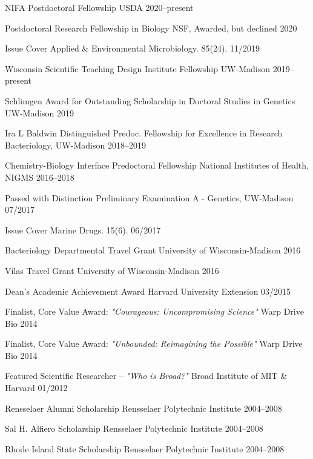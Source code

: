 \begin{cvhonors}

\cvhonor
{NIFA Postdoctoral Fellowship}
{USDA}
{2020--present}

\cvhonor
{Postdoctoral Research Fellowship in Biology}
{NSF, Awarded, but declined}
{2020}

\cvhonor
{Issue Cover}
{Applied \& Environmental Microbiology. 85(24).}
{11/2019}

\cvhonor
{Wisconsin Scientific Teaching Design Institute Fellowship}
{UW-Madison}
{2019--present}

\cvhonor
{Schlimgen Award for Outstanding Scholarship in Doctoral Studies in Genetics}
{UW-Madison}
{2019}

\cvhonor
{Ira L Baldwin Distinguished Predoc. Fellowship for Excellence in Research}
{Bacteriology, UW-Madison}
{2018--2019}

\cvhonor
{Chemistry-Biology Interface Predoctoral Fellowship}
{National Institutes of Health, NIGMS}
{2016--2018}

\cvhonor
{Passed with Distinction}
{Preliminary Examination A - Genetics, UW-Madison}
{07/2017}

\end{cvhonors} \begin{cvhonors}

\cvhonor
{Issue Cover}
{Marine Drugs. 15(6).}
{06/2017}

\cvhonor
{Bacteriology Departmental Travel Grant}
{University of Wisconsin-Madison}
{2016}

\cvhonor
{Vilas Travel Grant}
{University of Wisconsin-Madison}
{2016}

\cvhonor
{Dean's Academic Achievement Award}
{Harvard University Extension}
{03/2015}

\cvhonor
{Finalist, Core Value Award: \textit{"Courageous: Uncompromising Science"}}
{Warp Drive Bio}
{2014}

\cvhonor
{Finalist, Core Value Award: \textit{"Unbounded: Reimagining the Possible"}}
{Warp Drive Bio}
{2014}

\cvhonor
{Featured Scientific Researcher -- \textit{"Who is Broad?"}}
{Broad Institute of MIT \& Harvard}
{01/2012}

\cvhonor
{Rensselaer Alumni Scholarship}
{Rensselaer Polytechnic Institute}
{2004--2008}

\cvhonor
{Sal H. Alfiero Scholarship}
{Rensselaer Polytechnic Institute}
{2004--2008}

\cvhonor
{Rhode Island State Scholarship}
{Rensselaer Polytechnic Institute}
{2004--2008}

\end{cvhonors}
